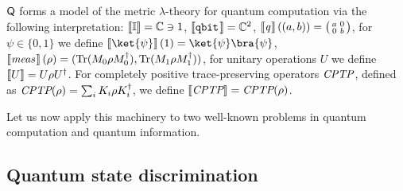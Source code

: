 $\mathsf{Q}$ forms a model of the metric $\lambda$-theory for quantum computation via the following interpretation: $\left \llbracket \mathbb{I} \right \rrbracket= \mathbb{C} \ni  1$, 
$\left \llbracket \mathtt{qbit} \hspace{1pt} \right \rrbracket= \mathbb{C}^2$, 
$\left \llbracket \emph{q} \hspace{1pt} \right \rrbracket((a,b)) = \big(\begin{smallmatrix}
  a & 0\\
  0 & b
\end{smallmatrix}\big)$, 
for $\psi \in \{0, 1\}$ we define $\sem{\ket{\psi}} (1)= \ket{\psi} \bra{\psi}$,
$\left \llbracket \emph{meas} \hspace{1pt} \right \rrbracket (\rho)= (\text{Tr} (M_{0} \rho M_{0}^{\dag}), \text{Tr} (M_{1} \rho M_{1}^{\dag}))$, 
for unitary operations $U$ we define $\left \llbracket U \right \rrbracket= U \rho U^{\dag}$. 
For completely positive trace-preserving operators $\emph{CPTP}$, defined as $\emph{CPTP} (\rho) = \sum_i K_i \rho K_i^{\dag}$, we define  $\left \llbracket \emph{CPTP} \right \rrbracket = \emph{CPTP}(\rho)$.

Let us now apply this machinery to two well-known problems in quantum computation
and quantum information.

\subsection{Quantum state discrimination}



